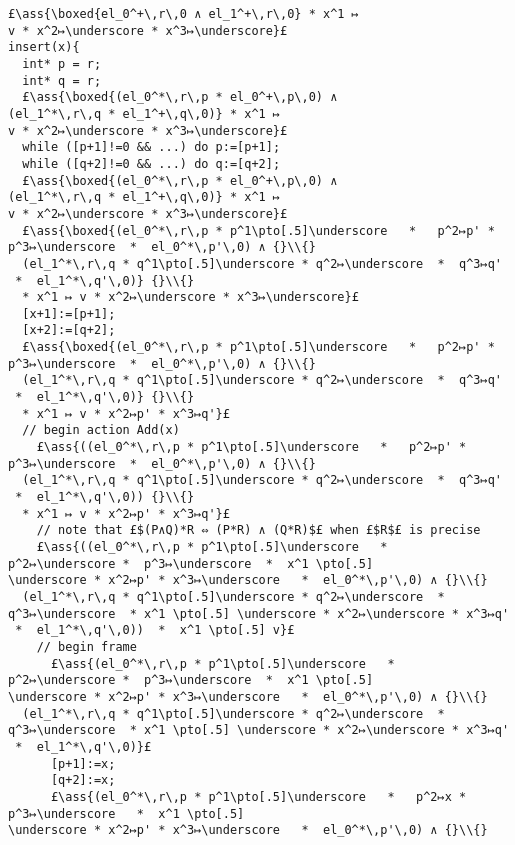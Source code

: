 \documentclass[12pt,a4paper]{article}
\makeatletter
\newcommand{\ml}[2][t]{\mbox{\mdseries\begin{tabular}[#1]{@{}L@{}}#2\end{tabular}}}
\newcommand{\ass}[1]{\ensuremath{{\color{blue}\left\{\ml[c]{#1}\right\}}}}
\makeatother
\begin{document}
\begin{lstlisting}
£\ass{\boxed{el_0^+\,r\,0 ∧ el_1^+\,r\,0} * x^1 ↦ v * x^2↦\underscore * x^3↦\underscore}£
insert(x){
  int* p = r;
  int* q = r;
  £\ass{\boxed{(el_0^*\,r\,p * el_0^+\,p\,0) ∧ (el_1^*\,r\,q * el_1^+\,q\,0)} * x^1 ↦ v * x^2↦\underscore * x^3↦\underscore}£
  while ([p+1]!=0 && ...) do p:=[p+1];
  while ([q+2]!=0 && ...) do q:=[q+2];
  £\ass{\boxed{(el_0^*\,r\,p * el_0^+\,p\,0) ∧ (el_1^*\,r\,q * el_1^+\,q\,0)} * x^1 ↦ v * x^2↦\underscore * x^3↦\underscore}£
  £\ass{\boxed{(el_0^*\,r\,p * p^1\pto[.5]\underscore   *   p^2↦p' *  p^3↦\underscore  *  el_0^*\,p'\,0) ∧ {}\\{}
  (el_1^*\,r\,q * q^1\pto[.5]\underscore * q^2↦\underscore  *  q^3↦q'  *  el_1^*\,q'\,0)} {}\\{} 
  * x^1 ↦ v * x^2↦\underscore * x^3↦\underscore}£
  [x+1]:=[p+1];
  [x+2]:=[q+2];
  £\ass{\boxed{(el_0^*\,r\,p * p^1\pto[.5]\underscore   *   p^2↦p' *  p^3↦\underscore  *  el_0^*\,p'\,0) ∧ {}\\{}
  (el_1^*\,r\,q * q^1\pto[.5]\underscore * q^2↦\underscore  *  q^3↦q'  *  el_1^*\,q'\,0)} {}\\{}
  * x^1 ↦ v * x^2↦p' * x^3↦q'}£
  // begin action Add(x)
    £\ass{((el_0^*\,r\,p * p^1\pto[.5]\underscore   *   p^2↦p' *  p^3↦\underscore  *  el_0^*\,p'\,0) ∧ {}\\{}
  (el_1^*\,r\,q * q^1\pto[.5]\underscore * q^2↦\underscore  *  q^3↦q'  *  el_1^*\,q'\,0)) {}\\{}
  * x^1 ↦ v * x^2↦p' * x^3↦q'}£
    // note that £$(P∧Q)*R ⇔ (P*R) ∧ (Q*R)$£ when £$R$£ is precise 
    £\ass{((el_0^*\,r\,p * p^1\pto[.5]\underscore   *   p^2↦\underscore *  p^3↦\underscore  *  x^1 \pto[.5] \underscore * x^2↦p' * x^3↦\underscore   *  el_0^*\,p'\,0) ∧ {}\\{}
  (el_1^*\,r\,q * q^1\pto[.5]\underscore * q^2↦\underscore  *  q^3↦\underscore  * x^1 \pto[.5] \underscore * x^2↦\underscore * x^3↦q'  *  el_1^*\,q'\,0))  *  x^1 \pto[.5] v}£
    // begin frame
      £\ass{(el_0^*\,r\,p * p^1\pto[.5]\underscore   *   p^2↦\underscore *  p^3↦\underscore  *  x^1 \pto[.5] \underscore * x^2↦p' * x^3↦\underscore   *  el_0^*\,p'\,0) ∧ {}\\{}
  (el_1^*\,r\,q * q^1\pto[.5]\underscore * q^2↦\underscore  *  q^3↦\underscore  * x^1 \pto[.5] \underscore * x^2↦\underscore * x^3↦q'  *  el_1^*\,q'\,0)}£
      [p+1]:=x;
      [q+2]:=x;
      £\ass{(el_0^*\,r\,p * p^1\pto[.5]\underscore   *   p^2↦x *  p^3↦\underscore   *  x^1 \pto[.5] \underscore * x^2↦p' * x^3↦\underscore   *  el_0^*\,p'\,0) ∧ {}\\{}

\end{lstlisting}
\end{document}
